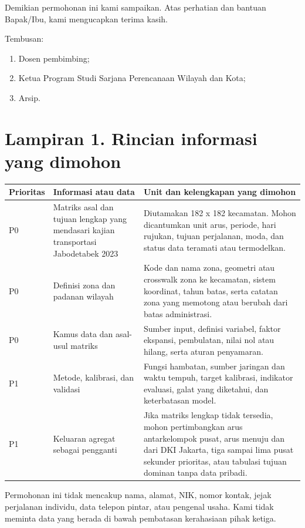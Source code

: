\documentclass[12pt]{article}
\begin{document}
Demikian permohonan ini kami sampaikan. Atas perhatian dan bantuan Bapak/Ibu, kami mengucapkan terima kasih.

\vspace{8pt}
Tembusan:
\begin{enumerate}
  \item Dosen pembimbing;
  \item Ketua Program Studi Sarjana Perencanaan Wilayah dan Kota;
  \item Arsip.
\end{enumerate}

\TandaTanganDTAP

\clearpage
\section*{Lampiran 1. Rincian informasi yang dimohon}

\renewcommand{\arraystretch}{1.25}
\begin{tabularx}{\textwidth}{@{}P{0.12\textwidth}P{0.34\textwidth}Y@{}}
\toprule
Prioritas & Informasi atau data & Unit dan kelengkapan yang dimohon \\
\midrule
P0 & Matriks asal dan tujuan lengkap yang mendasari kajian transportasi Jabodetabek 2023 & Diutamakan 182 x 182 kecamatan. Mohon dicantumkan unit arus, periode, hari rujukan, tujuan perjalanan, moda, dan status data teramati atau termodelkan. \\
P0 & Definisi zona dan padanan wilayah & Kode dan nama zona, geometri atau crosswalk zona ke kecamatan, sistem koordinat, tahun batas, serta catatan zona yang memotong atau berubah dari batas administrasi. \\
P0 & Kamus data dan asal-usul matriks & Sumber input, definisi variabel, faktor ekspansi, pembulatan, nilai nol atau hilang, serta aturan penyamaran. \\
P1 & Metode, kalibrasi, dan validasi & Fungsi hambatan, sumber jaringan dan waktu tempuh, target kalibrasi, indikator evaluasi, galat yang diketahui, dan keterbatasan model. \\
P1 & Keluaran agregat sebagai pengganti & Jika matriks lengkap tidak tersedia, mohon pertimbangkan arus antarkelompok pusat, arus menuju dan dari DKI Jakarta, tiga sampai lima pusat sekunder prioritas, atau tabulasi tujuan dominan tanpa data pribadi. \\
\bottomrule
\end{tabularx}

\vspace{8pt}
Permohonan ini tidak mencakup nama, alamat, NIK, nomor kontak, jejak perjalanan individu, data telepon pintar, atau pengenal usaha. Kami tidak meminta data yang berada di bawah pembatasan kerahasiaan pihak ketiga.

\LampiranAbstraksi
\end{document}
